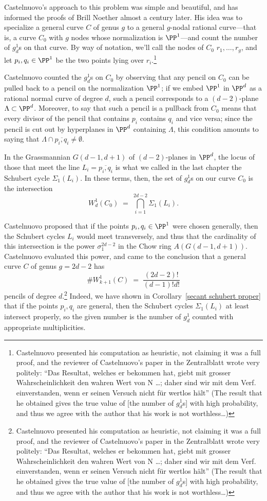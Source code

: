 Castelnuovo's approach to this problem was simple and beautiful, and has informed the proofs of Brill Noether almost a century later. His idea was to specialize a general curve $C$ of genus $g$ to a general $g$-nodal rational curve---that is, a curve $C_0$ with $g$ nodes whose normalization is $\PP^1$---and count the number of $g^1_d$s on that curve. By way of notation, we'll call the nodes of $C_0$ $r_1,\dots,r_g$, and let $p_i, q_i \in \PP^1$ be the two points lying over $r_i$.\footnote{Castelnuovo presented his computation as heuristic, not claiming it was a full proof, and the reviewer of Castelnuovo's paper in the Zentralblatt wrote very politely:
``Das Resultat, welches er bekommen hat, giebt mit grosser Wahrscheinlichkeit den wahren Wert von N \dots; daher sind wir mit dem Verf. einverstanden, wenn er seinen Versuch nicht für wertlos hält''
(The result that he obtained gives the true value of [the number of $g^1_d$s] with high probability, and thus we agree with the author that his work is not worthless\dots)}

Castelnuovo counted the $g^1_d$s on $C_0$ by observing that any pencil on $C_0$ can be pulled back to a pencil on the normalization $\PP^1$; if we embed $\PP^1$ in $\PP^d$ as a rational normal curve of degree $d$, such a pencil corresponds to a $(d-2)$-plane $\Lambda \subset \PP^d$. Moreover, to say that such a pencil is a pullback from $C_0$ means that every divisor of the pencil that contains $p_i$ contains $q_i$ and vice versa; since the pencil is cut out by hyperplanes in $\PP^d$ containing $\Lambda$, this condition amounts to saying that $\Lambda \cap \overline{p_i,q_i} \neq \emptyset$.

In the Grassmannian $G(d-1, d+1)$ of $(d-2)$-planes in $\PP^d$, the locus of those that meet the line $L_i = \overline{p_i,q_i}$ is what we called in the last chapter the Schubert cycle $\Sigma_1(L_i)$. In these terms, then, the set of $g^1_d$s on our curve $C_0$ is the intersection
$$
W^1_d(C_0) \; = \; \bigcap_{i=1}^{2d-2} \Sigma_1(L_i).
$$

Castelnuovo proposed that if the points $p_i, q_i\in \PP^1$ were chosen generally, then the Schubert cycles
$L_i$ would meet transversely, and thus that the cardinality of this intersection is the power $\sigma_1^{2d-2}$ in the Chow ring $A(G(d-1, d+1))$. Castelnuovo evaluated this power, and came to the conclusion that a general curve $C$ of genus $g=2d-2$ has 
$$
\#W^1_{k+1}(C) \; = \; \frac{(2d-2)!}{(d-1)!d!}
$$
pencils of degree $d$.\footnote{Castelnuovo presented his computation as heuristic, not claiming it was a full proof, and the reviewer of Castelnuovo's paper in the Zentralblatt wrote very politely:
``Das Resultat, welches er bekommen hat, giebt mit grosser Wahrscheinlichkeit den wahren Wert von N \dots; daher sind wir mit dem Verf. einverstanden, wenn er seinen Versuch nicht für wertlos hält''
(The result that he obtained gives the true value of [the number of $g^1_d$s] with high probability, and thus we agree with the author that his work is not worthless\dots)} Indeed, we have shown
 in Corollary~\ref{secant schubert proper} that if the points $p_i, q_i$ are general, then the Schubert cycles $\Sigma_1(L_i)$ at least intersect properly, so the given number is the number of $g^1_d$ counted with appropriate multiplicities.

